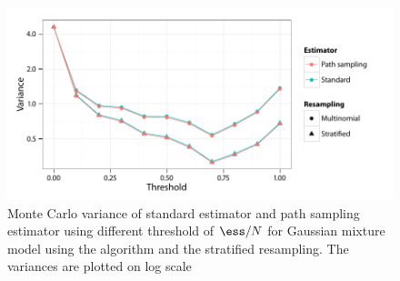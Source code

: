 \begin{figure}
  \linespread{1.1}\selectfont
  \includegraphics[width=\linewidth]{fig_src/GMM_Resample}
  \caption[Variance of standard standard estimator and path sampling using
  adaptive resampling]
  {Monte Carlo variance of standard estimator and path sampling estimator
    using different threshold of $\ess/N$ for Gaussian mixture model using the
    \smc[2] algorithm and the stratified resampling. The variances are plotted
    on log scale}
  \label{fig:gmm resample}
\end{figure}
